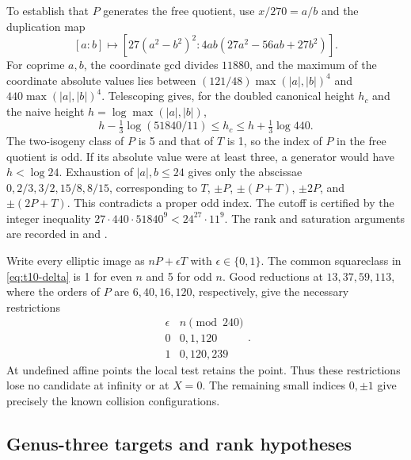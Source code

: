 To establish that $P$ generates the free quotient, use $x/270=a/b$
and the duplication map
\[
 [a:b]\longmapsto
 [27(a^2-b^2)^2:4ab(27a^2-56ab+27b^2)].
\]
For coprime $a,b$, the coordinate gcd divides $11880$, and the maximum
of the coordinate absolute values lies between
$(121/48)\max(|a|,|b|)^4$ and $440\max(|a|,|b|)^4$.
Telescoping gives, for the doubled canonical height $h_c$ and the
naive height $h=\log\max(|a|,|b|)$,
\[
 h-\tfrac13\log(51840/11)\leq h_c
               \leq h+\tfrac13\log440.
\]
The two-isogeny class of $P$ is 5 and that of $T$ is 1, so the index
of $P$ in the free quotient is odd. If its absolute value were at
least three, a generator would have $h<\log24$. Exhaustion of
$|a|,b\leq24$ gives only the abscissae
$0,2/3,3/2,15/8,8/15$, corresponding to $T$, $\pm P$,
$\pm(P+T)$, $\pm2P$, and $\pm(2P+T)$. This contradicts a proper
odd index. The cutoff is certified by the integer inequality
$27\cdot440\cdot51840^9<24^{27}\cdot11^9$.
The rank and saturation arguments are recorded in
 and .

Write every elliptic image as $nP+\epsilon T$ with $\epsilon\in\{0,1\}$.
The common squareclass in \eqref{eq:t10-delta} is 1 for even $n$ and
5 for odd $n$. Good reductions at $13,37,59,113$, where the orders of
$P$ are $6,40,16,120$, respectively, give the necessary restrictions
\begin{equation}\label{eq:t10-mod240}
 \begin{array}{c|c}
 \epsilon& n\pmod{240}\\ \hline
 0&0,1,120\\
 1&0,120,239
 \end{array}.
\end{equation}
At undefined affine points the local test retains the point. Thus these
restrictions lose no candidate at infinity or at $X=0$. The remaining
small indices $0,\pm1$ give precisely the known collision configurations.

\subsection{Genus-three targets and rank hypotheses}

